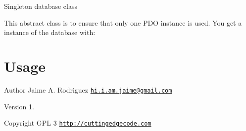 Singleton database class

This abstract class is to ensure that only one P\-D\-O instance is used. You get a instance of the database with\-:\hypertarget{template1_usage}{}\section{Usage}\label{template1_usage}



\begin{DoxyAuthor}{Author}
Jaime A. Rodriguez \href{mailto:hi.i.am.jaime@gmail.com}{\tt hi.\-i.\-am.\-jaime@gmail.\-com} 
\end{DoxyAuthor}
\begin{DoxyVersion}{Version}
1. 
\end{DoxyVersion}
\begin{DoxyCopyright}{Copyright}
G\-P\-L 3 \href{http://cuttingedgecode.com}{\tt http\-://cuttingedgecode.\-com} 
\end{DoxyCopyright}
